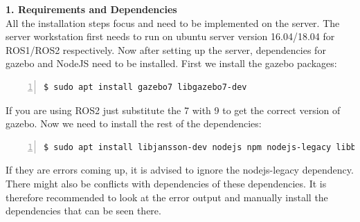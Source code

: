 \documentclass[plainarticle,zihtitle,english,final,hyperref,utf8]{zihpub}
\begin{document}
\textbf{1. Requirements and Dependencies}\\
\newline
All the installation steps focus and need to be implemented on the server. The server workstation first needs to run on ubuntu server version 16.04/18.04 for ROS1/ROS2 respectively. Now after setting up the server, dependencies for gazebo and NodeJS need to be installed. First we install the gazebo packages:\\
\begin{Verbatim}[breaklines=true, breakanywhere=true, baselinestretch=1,fontsize=\scriptsize,numbers=left,frame=single,stepnumber=5,xleftmargin=1cm,xrightmargin=1cm]
$ sudo apt install gazebo7 libgazebo7-dev

\end{Verbatim}
\newline
If you are using ROS2 just substitute the 7 with 9 to get the correct version of gazebo. Now we need to install the rest of the dependencies:\\
\begin{Verbatim}[breaklines=true, breakanywhere=true, baselinestretch=1,fontsize=\scriptsize,numbers=left,frame=single,stepnumber=5,xleftmargin=1cm,xrightmargin=1cm]
$ sudo apt install libjansson-dev nodejs npm nodejs-legacy libboost-dev imagemagick libtinyxml-dev mercurial cmake build-essential

\end{Verbatim}
If they are errors coming up, it is advised to ignore the nodejs-legacy dependency. There might also be conflicts with dependencies of these dependencies. It is therefore recommended to look at the error output and manually install the dependencies that can be seen there.
\newline
\end{document}
